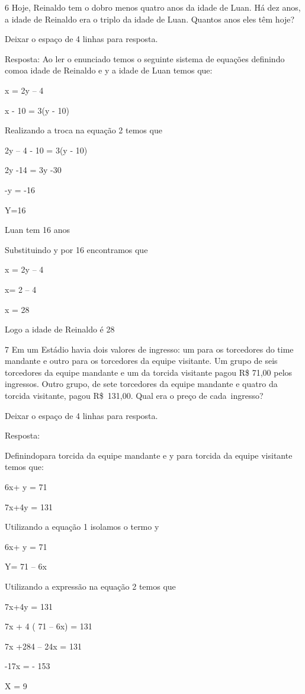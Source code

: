 \num{6} Hoje, Reinaldo tem o dobro menos quatro anos da idade de Luan. Há dez
anos, a idade de Reinaldo era o triplo da idade de Luan. Quantos anos
eles têm hoje?

Deixar o espaço de 4 linhas para resposta.

Resposta: Ao ler o enunciado temos o seguinte sistema de equações
definindo como\times a idade de Reinaldo e y a idade de Luan temos que:

x = 2y -- 4

x - 10 = 3(y - 10)

Realizando a troca na equação 2 temos que

2y -- 4 - 10 = 3(y - 10)

2y -14 = 3y -30

-y = -16

Y=16

Luan tem 16 anos

Substituindo y por 16 encontramos que

x = 2y -- 4

x= 2 -- 4

x = 28

Logo a idade de Reinaldo é 28

\num{7} Em um Estádio havia dois valores de ingresso: um para os torcedores
do time mandante e outro para os torcedores da equipe visitante. Um
grupo de seis torcedores da equipe mandante e um da torcida visitante
pagou R\$ 71,00 pelos ingressos. Outro grupo, de sete torcedores da
equipe mandante e quatro da torcida visitante, pagou R\$~131,00. Qual
era o preço de cada~ingresso?

Deixar o espaço de 4 linhas para resposta.

Resposta:

Definindo\times para torcida da equipe mandante e y para torcida da equipe
visitante temos que:

6x+ y = 71

7x+4y = 131

Utilizando a equação 1 isolamos o termo y

6x+ y = 71

Y= 71 -- 6x

Utilizando a expressão na equação 2 temos que

7x+4y = 131

7x + 4 ( 71 -- 6x) = 131

7x +284 -- 24x = 131

-17x = - 153

X = 9

